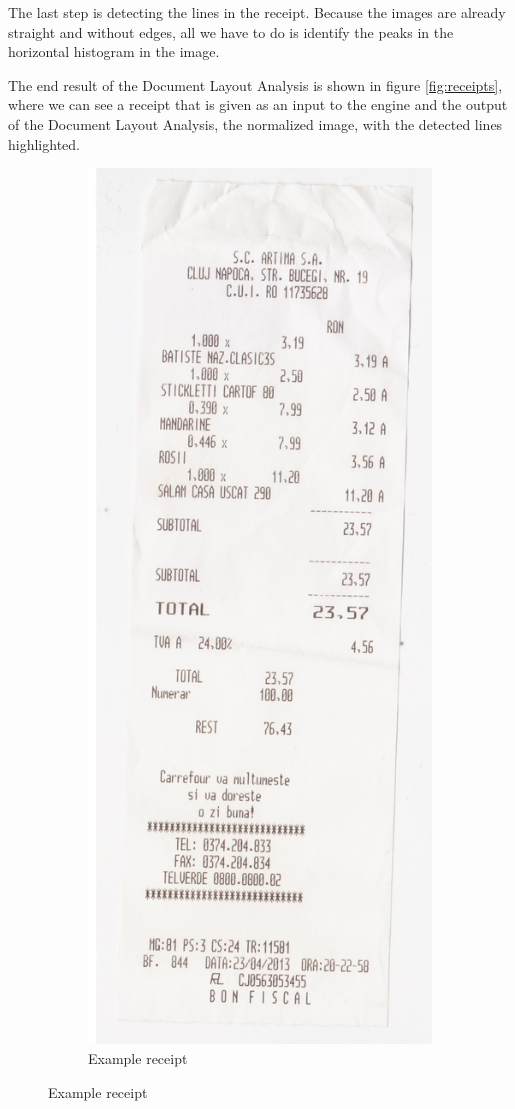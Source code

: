 The last step is detecting the lines in the receipt. Because the images are already straight and without edges, all we have to do is identify the peaks in the horizontal histogram in the image.  

The end result of the Document Layout Analysis is shown in figure \ref{fig:receipts}, where we can see a receipt that is given as an input to the engine and the output of the Document Layout Analysis, the normalized image, with the detected lines highlighted.


\begin{figure}
\centering
\begin{subfigure}{0.45\linewidth}
  \centering
  \includegraphics[width=.6\linewidth]{img/bon1.jpg}
  \caption{Example receipt}
  \label{fig:sub1}

\end{subfigure}
\end{figure}
